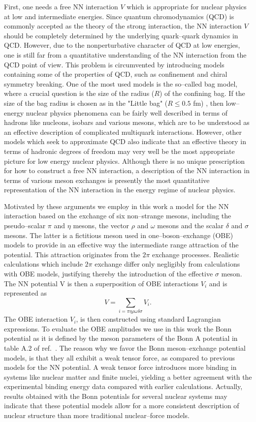 First, one needs a free NN interaction $V$ which is
appropriate for nuclear physics at low and intermediate energies. 
Since quantum chromodynamics (QCD) is commonly
accepted as the theory of the strong interaction, the
NN interaction $V$ should be  completely determined by the underlying
quark--quark dynamics in QCD. However, due to the nonperturbative
character of QCD at low energies, one is still far from a
quantitative understanding of the NN interaction from the QCD point of
view. This problem is circumvented by introducing
models containing some of the properties of QCD, such as
confinement and chiral symmetry breaking. One of the most used models
is the so--called bag model, where a crucial question is the
size of the radius ($R$) of the confining bag. If the size of the bag radius
is chosen as in the "Little bag" ($R\leq 0.5$ fm) \cite{br79}, then
low--energy nuclear physics phenomena can be fairly well described
in terms of hadrons like nucleons, isobars and various mesons,
which are to be understood as an effective description of complicated
multiquark interactions.
However, other models which
seek to approximate QCD also indicate that an effective theory in terms
of hadronic degrees of freedom may very well be the most appropriate
picture for low energy nuclear physics.
Although there is no unique prescription for how to construct
a free NN interaction, a description
of the NN interaction in terms of various meson exchanges is presently
the most quantitative representation of the NN interaction
\cite{mac89}
in the energy regime of nuclear physics.

Motivated by these arguments we employ in this work a model for the
NN interaction based on the exchange of six non--strange mesons, including
the pseudo--scalar $\pi$ and $\eta$ mesons, the vector $\rho$ and $\omega$
mesons and the scalar $\delta$ and $\sigma$ mesons. The latter is
a fictitious meson used in one--boson--exchange (OBE) models to provide in an
effective way the intermediate
range attraction of the potential. This attraction
originates from the $2\pi$ exchange processes.
Realistic calculations \cite{mac89}
which include $2\pi$ exchange differ only negligibly from calculations
with OBE models, justifying thereby the introduction of the effective
$\sigma$ meson.
The NN potential V is then a superposition of OBE interactions $V_i$
and is represented as
\[
V=\sum_{i=\pi\eta\rho\omega\delta\sigma}V_i .
\]
The OBE interaction $V_i$, is then constructed using
standard Lagrangian expressions.
To evaluate the OBE amplitudes we use in this work the
Bonn potential as it is defined by the meson parameters of the Bonn A potential
in table
A.2 of ref.~\cite{mac89}. The reason why we favor the Bonn meson--exchange
potential models, is that  they  all exhibit a weak tensor force,
as compared to previous models for the NN potential.
A weak tensor force introduces more binding in systems like nuclear matter
and finite nuclei, yielding a better agreement with the
experimental binding energy data compared with earlier calculations.
Actually, results obtained with the Bonn potentials
for several nuclear systems \cite{mac89,hko94} may indicate that these potential
models allow for a more consistent description of nuclear structure than more
traditional nuclear--force models.
%
